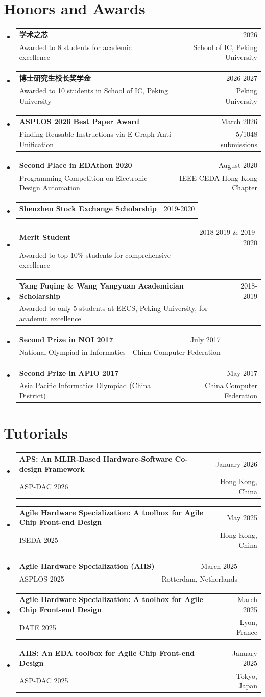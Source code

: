 \documentclass[letterpaper,11pt]{article} %
\makeatletter
\newcommand{\CVSubheading}[4]{
  \vspace{-2pt}\item
    \begin{tabular*}{0.97\textwidth}[t]{l@{\extracolsep{\fill}}r}
      \textbf{#1} & #2 \\
      \small#3 & \small #4 \\
    \end{tabular*}\vspace{-7pt}
}
\newcommand{\CVSubHeadingListStart}{\begin{itemize}[leftmargin=0.5cm, label={}]}
\newcommand{\CVSubHeadingListEnd}{\end{itemize}}
\makeatother
\begin{document}
\section{Honors and Awards}
  \CVSubHeadingListStart
    \CVSubheading
      {学术之芯}{2026}
      {Awarded to 8 students for academic excellence}{School of IC, Peking University}
    \CVSubheading
      {博士研究生校长奖学金}{2026-2027}
      {Awarded to 10 students in School of IC, Peking University}{Peking University}
    \CVSubheading
      {ASPLOS 2026 Best Paper Award}{March 2026}
      {Finding Reusable Instructions via E-Graph Anti-Unification}{5/1048 submissions}
    \CVSubheading
      {Second Place in EDAthon 2020}{August 2020}
      {Programming Competition on Electronic Design Automation}{IEEE CEDA Hong Kong Chapter}
    \CVSubheading
      {Shenzhen Stock Exchange Scholarship}{2019-2020}
      {}{}
    \CVSubheading
      {Merit Student}{2018-2019 \& 2019-2020}
      {Awarded to top 10\% students for comprehensive excellence}{}    
    \CVSubheading
      {Yang Fuqing \& Wang Yangyuan Academician Scholarship}{2018-2019}
      {Awarded to only 5 students at EECS, Peking University, for academic excellence}{}
    \CVSubheading
      {Second Prize in NOI 2017}{July 2017}
      {National Olympiad in Informatics}{China Computer Federation}
    \CVSubheading
      {Second Prize in APIO 2017}{May 2017}
      {Asia Pacific Informatics Olympiad (China District)}{China Computer Federation}
  \CVSubHeadingListEnd

\section{Tutorials}
  \CVSubHeadingListStart
    \CVSubheading
      {APS: An MLIR-Based Hardware-Software Co-design Framework}{January 2026}
      {ASP-DAC 2026}{Hong Kong, China}
    \CVSubheading
      {Agile Hardware Specialization: A toolbox for Agile Chip Front-end Design}{May 2025}
      {ISEDA 2025}{Hong Kong, China}
    \CVSubheading
      {Agile Hardware Specialization (AHS)}{March 2025}
      {ASPLOS 2025}{Rotterdam, Netherlands}
    \CVSubheading
      {Agile Hardware Specialization: A toolbox for Agile Chip Front-end Design}{March 2025}
      {DATE 2025}{Lyon, France}
    \CVSubheading
      {AHS: An EDA toolbox for Agile Chip Front-end Design}{January 2025}
      {ASP-DAC 2025}{Tokyo, Japan}
  \CVSubHeadingListEnd

\end{document}
